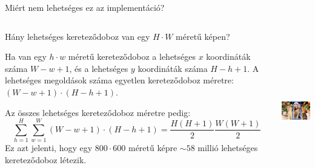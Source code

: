 \documentclass[english, aspectratio=169]{beamer}
\begin{document}
	\begin{frame}{Miért nem lehetséges ez az implementáció?}
		\begin{columns}
			\begin{column}{.7\textwidth}
				Hány lehetséges kereteződoboz van egy $H \cdot W$ méretű képen?\par\medskip
				Ha van egy $h \cdot w$ méretű kereteződoboz a lehetséges $x$ koordináták száma $W-w+1$, és a lehetséges $y$ koordináták száma $H-h+1$. A lehetséges megoldások száma egyetlen kereteződoboz méretre: $(W-w+1) \cdot (H-h+1)$.\par\medskip
				Az összes lehetséges kereteződoboz méretre pedig:
				\[
				\sum_{h=1}^H \sum_{w=1}^W (W-w+1) \cdot (H-h+1) = \frac{H(H+1)}{2} \frac{W(W+1)}{2}
				\]
				Ez azt jelenti, hogy egy $800 \cdot 600$ méretű képre $\sim 58$ millió lehetséges kereteződoboz létezik.
			\end{column}
			\begin{column}{.3\textwidth}
				\begin{center}
					\includegraphics[height=7cm, width=4cm, keepaspectratio]{images/od_7.png}
				\end{center}
			\end{column}
		\end{columns}
	\end{frame}
	
\end{document}
